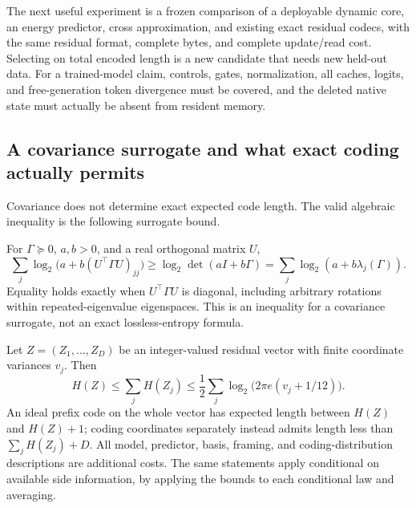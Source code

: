The next useful experiment is a frozen comparison of a deployable dynamic
core, an energy predictor, cross approximation, and existing exact residual codecs, with the
same residual format, complete bytes, and complete update/read cost.
Selecting on total encoded length is a new candidate that needs new held-out
data. For a trained-model claim, controls, gates, normalization, all caches,
logits, and free-generation token divergence must be covered, and the
deleted native state must actually be absent from resident memory.
\subsection{A covariance surrogate and what exact coding actually permits}
\label{III:U:sec:codec-covariance-audit}
Covariance does not determine exact expected code length. The valid
algebraic inequality is the following surrogate bound.

\begin{proposition}
\label{III:U:prop:covariance-surrogate}
For $\Gamma\succeq0$, $a,b>0$, and a real orthogonal matrix $U$,
\begin{equation}
 \sum_j\log_2\bigl(a+b(U^\top\Gamma U)_{jj}\bigr)
 \ge\log_2\det(aI+b\Gamma)
 =\sum_j\log_2(a+b\lambda_j(\Gamma)).
 \label{III:U:eq:covariance-surrogate}
\end{equation}
Equality holds exactly when $U^\top\Gamma U$ is diagonal, including
arbitrary rotations within repeated-eigenvalue eigenspaces.
This is an inequality for a covariance surrogate, not an exact
lossless-entropy formula.
\end{proposition}


\begin{proposition}
\label{III:U:prop:discrete-entropy-bound}
Let $Z=(Z_1,\ldots,Z_D)$ be an integer-valued residual vector with
finite coordinate variances $v_j$. Then
\begin{equation}
 H(Z)\le\sum_jH(Z_j)
 \le\frac12\sum_j\log_2\!\bigl(2\pi e(v_j+1/12)\bigr).
 \label{III:U:eq:discrete-entropy-bound}
\end{equation}
An ideal prefix code on the whole vector has expected length between
$H(Z)$ and $H(Z)+1$; coding coordinates separately instead admits
length less than $\sum_jH(Z_j)+D$. All model, predictor, basis,
framing, and coding-distribution descriptions are additional costs.
The same statements apply conditional on available side information,
by applying the bounds to each conditional law and averaging.
\end{proposition}


